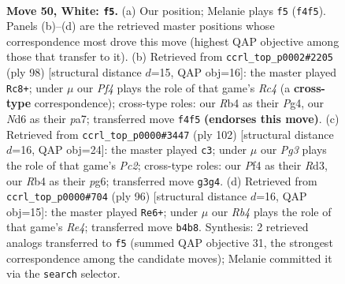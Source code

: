 \documentclass[11pt]{article}
\begin{document}
\clearpage

\begin{figure}[p]\centering
\begin{subfigure}{0.46\textwidth}\centering
\resizebox{\linewidth}{!}{%
\newchessgame
\chessboard[
  setfen={7k/6p1/3Npp2/7p/1R1P1P1P/4r1P1/6K1/8 w - - 0 50},
  showmover=false,
  pgfstyle=straightmove, color=movearrow, markmove={f4-f5}
]}
\caption{}
\end{subfigure}\hfill
\begin{subfigure}{0.46\textwidth}\centering
\resizebox{\linewidth}{!}{%
\newchessgame
\chessboard[
  setfen={6k1/p5p1/1p5p/1P5P/P1R3P1/r4p2/5K2/8 w - - 16 50},
  showmover=false,
  pgfstyle=straightmove, color=movearrow, markmove={c4-c8}
]}
\caption{}
\end{subfigure}
\\[4pt]
\begin{subfigure}{0.46\textwidth}\centering
\resizebox{\linewidth}{!}{%
\newchessgame
\chessboard[
  setfen={7k/7p/6p1/5p2/p1r5/3R1P1P/1KP3P1/8 w - - 6 52},
  showmover=false,
  pgfstyle=straightmove, color=movearrow, markmove={c2-c3}
]}
\caption{}
\end{subfigure}\hfill
\begin{subfigure}{0.46\textwidth}\centering
\resizebox{\linewidth}{!}{%
\newchessgame
\chessboard[
  setfen={8/8/1p4k1/p5p1/P1P1R3/1r4P1/6KP/8 w - - 1 49},
  showmover=false,
  pgfstyle=straightmove, color=movearrow, markmove={e4-e6}
]}
\caption{}
\end{subfigure}
\caption{\textbf{Move 50, White: \texttt{f5}.} (a) Our position; Melanie plays \texttt{f5} (\texttt{f4f5}). Panels (b)--(d) are the retrieved master positions whose correspondence most drove this move (highest QAP objective among those that transfer to it). (b) Retrieved from \texttt{ccrl\_top\_p0002\#2205} (ply 98) [structural distance $d$=15, QAP obj=16]: the master played \texttt{Rc8+}; under $\mu$ our \emph{Pf4} plays the role of that game's \emph{Rc4} (a \textbf{cross-type} correspondence); cross-type roles: our \emph{R}b4 as their \emph{P}g4, our \emph{N}d6 as their \emph{p}a7; transferred move \texttt{f4f5} \textbf{(endorses this move)}. (c) Retrieved from \texttt{ccrl\_top\_p0000\#3447} (ply 102) [structural distance $d$=16, QAP obj=24]: the master played \texttt{c3}; under $\mu$ our \emph{Pg3} plays the role of that game's \emph{Pc2}; cross-type roles: our \emph{P}f4 as their \emph{R}d3, our \emph{R}b4 as their \emph{p}g6; transferred move \texttt{g3g4}. (d) Retrieved from \texttt{ccrl\_top\_p0000\#704} (ply 96) [structural distance $d$=16, QAP obj=15]: the master played \texttt{Re6+}; under $\mu$ our \emph{Rb4} plays the role of that game's \emph{Re4}; transferred move \texttt{b4b8}. Synthesis: 2 retrieved analogs transferred to \texttt{f5} (summed QAP objective 31, the strongest correspondence among the candidate moves); Melanie committed it via the \texttt{search} selector.}
\label{fig:thought-m98}
\end{figure}
\end{document}
